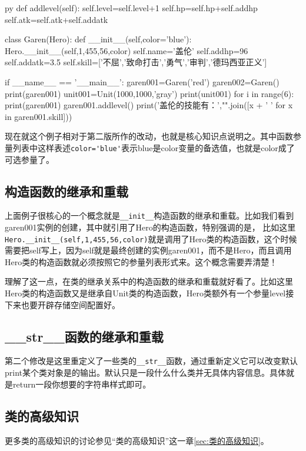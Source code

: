\documentclass[12pt,oneside]{book}
\begin{document}
\begin{common-format}
\begin{xverbatim}[129]{py}
    def addlevel(self):
        self.level=self.level+1
        self.hp=self.hp+self.addhp
        self.atk=self.atk+self.addatk

class Garen(Hero):
    def __init__(self,color='blue'):
        Hero.__init__(self,1,455,56,color)
        self.name='盖伦'
        self.addhp=96
        self.addatk=3.5
        self.skill=['不屈','致命打击','勇气','审判','德玛西亚正义']

if __name__ == '__main__':
    garen001=Garen('red')
    garen002=Garen()
    print(garen001)
    unit001=Unit(1000,1000,'gray')
    print(unit001)
    for i in range(6):
        print(garen001)
        garen001.addlevel()
    print('盖伦的技能有：',"".join([x + '  ' for x in garen001.skill]))
\end{xverbatim}
现在就这个例子相对于第二版所作的改动，也就是核心知识点说明之。其中函数参量列表中这样表述\verb+color='blue'+表示blue是color变量的备选值，也就是color成了可选参量了。


\subsection{构造函数的继承和重载}
上面例子很核心的一个概念就是\verb+__init__+构造函数的继承和重载。比如我们看到garen001实例的创建，其中就引用了Hero的构造函数，特别强调的是， 比如这里\\
\verb+Hero.__init__(self,1,455,56,color)+就是调用了Hero类的构造函数，这个时候需要把self写上，因为self就是最终创建的实例garen001，而不是Hero，而且调用Hero类的构造函数就必须按照它的参量列表形式来。这个概念需要弄清楚！

理解了这一点，在类的继承关系中的构造函数的继承和重载就好看了。比如这里Hero类的构造函数又是继承自Unit类的构造函数，Hero类额外有一个参量level接下来也要开辟存储空间配置好。

\subsection{\_\_str\_\_{}函数的继承和重载}
第二个修改是这里重定义了一些类的\verb+__str__+函数，通过重新定义它可以改变默认print某个类对象是的输出。默认只是一段什么什么类并无具体内容信息。具体就是return一段你想要的字符串样式即可。




\subsection{类的高级知识}
更多类的高级知识的讨论参见“类的高级知识”这一章\ref{sec:类的高级知识}。






\end{common-format}
\end{document}
